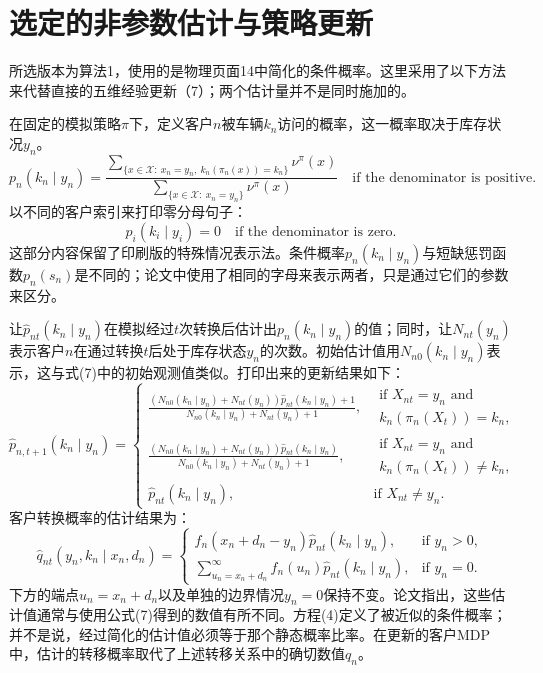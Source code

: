 \documentclass{article}
\begin{document}
\section*{选定的非参数估计与策略更新}

所选版本为算法1，使用的是物理页面14中简化的条件概率。这里采用了以下方法来代替直接的五维经验更新（7）；两个估计量并不是同时施加的。

在固定的模拟策略$\pi$下，定义客户$n$被车辆$k_n$访问的概率，这一概率取决于库存状况$y_n$。
\[
p_n(k_n\mid y_n)=
\frac{
\displaystyle\sum_{\{x\in\mathcal X:\ x_n=y_n,\ k_n(\pi_n(x))=k_n\}}\nu^\pi(x)
}{
\displaystyle\sum_{\{x\in\mathcal X:\ x_n=y_n\}}\nu^\pi(x)
}
\quad\text{if the denominator is positive}.
\]
以不同的客户索引来打印零分母句子：
\[
p_i(k_i\mid y_i)=0\quad\text{if the denominator is zero}.
\]
这部分内容保留了印刷版的特殊情况表示法。条件概率$p_n(k_n\mid y_n)$与短缺惩罚函数$p_n(s_n)$是不同的；论文中使用了相同的字母来表示两者，只是通过它们的参数来区分。

让$\hat p_{nt}(k_n\mid y_n)$在模拟经过$t$次转换后估计出$p_n(k_n\mid y_n)$的值；同时，让$N_{nt}(y_n)$表示客户$n$在通过转换$t$后处于库存状态$y_n$的次数。初始估计值用$N_{n0}(k_n\mid y_n)$表示，这与式(7)中的初始观测值类似。打印出来的更新结果如下：
\[
\hat p_{n,t+1}(k_n\mid y_n)=
\begin{cases}
\displaystyle
\frac{(N_{n0}(k_n\mid y_n)+N_{nt}(y_n))\hat p_{nt}(k_n\mid y_n)+1}
{N_{n0}(k_n\mid y_n)+N_{nt}(y_n)+1},
&\begin{array}{l}
\text{if }X_{nt}=y_n\text{ and}\\
k_n(\pi_n(X_t))=k_n,
\end{array}\\[4mm]
\displaystyle
\frac{(N_{n0}(k_n\mid y_n)+N_{nt}(y_n))\hat p_{nt}(k_n\mid y_n)}
{N_{n0}(k_n\mid y_n)+N_{nt}(y_n)+1},
&\begin{array}{l}
\text{if }X_{nt}=y_n\text{ and}\\
k_n(\pi_n(X_t))\ne k_n,
\end{array}\\[4mm]
\hat p_{nt}(k_n\mid y_n),&\text{if }X_{nt}\ne y_n.
\end{cases}
\]
客户转换概率的估计结果为：
\[
\hat q_{nt}(y_n,k_n\mid x_n,d_n)=
\begin{cases}
f_n(x_n+d_n-y_n)\hat p_{nt}(k_n\mid y_n),&\text{if }y_n>0,\\[1mm]
\displaystyle\sum_{u_n=x_n+d_n}^{\infty}f_n(u_n)\hat p_{nt}(k_n\mid y_n),&\text{if }y_n=0.
\end{cases}
\]
下方的端点$u_n=x_n+d_n$以及单独的边界情况$y_n=0$保持不变。论文指出，这些估计值通常与使用公式(7)得到的数值有所不同。方程(4)定义了被近似的条件概率；并不是说，经过简化的估计值必须等于那个静态概率比率。在更新的客户MDP中，估计的转移概率取代了上述转移关系中的确切数值$q_n$。
\end{document}
